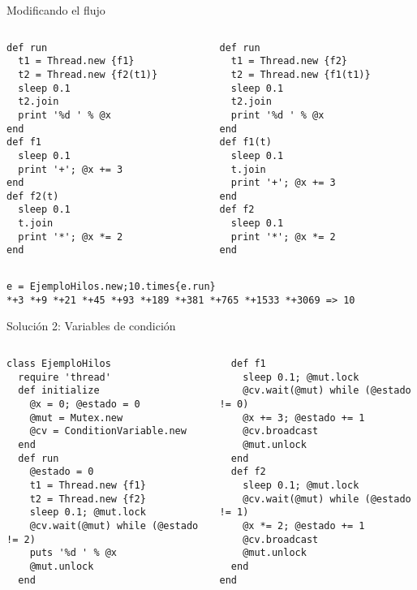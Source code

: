 \documentclass[presentation]{beamer}
\newcommand{\rarrow}{$\rightarrow$\hskip 0.5em}
\begin{document}
\begin{frame}[label={sec:orgd9313c2},fragile]{Modificando el flujo}
 \begin{columns}\begin{column}{0.45\textwidth}
\begin{verbatim}
def run
  t1 = Thread.new {f1}
  t2 = Thread.new {f2(t1)}
  sleep 0.1
  t2.join
  print '%d ' % @x
end
def f1
  sleep 0.1
  print '+'; @x += 3
end
def f2(t)
  sleep 0.1
  t.join
  print '*'; @x *= 2
end
\end{verbatim}
\end{column}  \begin{column}{0.45\textwidth}
\begin{verbatim}
def run
  t1 = Thread.new {f2}
  t2 = Thread.new {f1(t1)}
  sleep 0.1
  t2.join
  print '%d ' % @x
end
def f1(t)
  sleep 0.1
  t.join
  print '+'; @x += 3
end
def f2
  sleep 0.1
  print '*'; @x *= 2
end
\end{verbatim}
\end{column}\end{columns}
\begin{verbatim}
e = EjemploHilos.new;10.times{e.run}
*+3 *+9 *+21 *+45 *+93 *+189 *+381 *+765 *+1533 *+3069 => 10
\end{verbatim}
\end{frame}

\begin{frame}[label={sec:orgd066a66},fragile]{Solución 2: Variables de condición}
 \begin{columns}\begin{column}{0.5\textwidth}
\begin{verbatim}
class EjemploHilos
  require 'thread'
  def initialize
    @x = 0; @estado = 0
    @mut = Mutex.new
    @cv = ConditionVariable.new
  end
  def run
    @estado = 0
    t1 = Thread.new {f1}
    t2 = Thread.new {f2}
    sleep 0.1; @mut.lock
    @cv.wait(@mut) while (@estado != 2)
    puts '%d ' % @x
    @mut.unlock
  end
\end{verbatim}
\end{column} \begin{column}{0.5\textwidth}
\begin{verbatim}
  def f1
    sleep 0.1; @mut.lock
    @cv.wait(@mut) while (@estado != 0)
    @x += 3; @estado += 1
    @cv.broadcast
    @mut.unlock
  end
  def f2
    sleep 0.1; @mut.lock
    @cv.wait(@mut) while (@estado != 1)
    @x *= 2; @estado += 1
    @cv.broadcast
    @mut.unlock
  end
end
\end{verbatim}
\end{column}\end{columns}
\end{frame}
\end{document}

